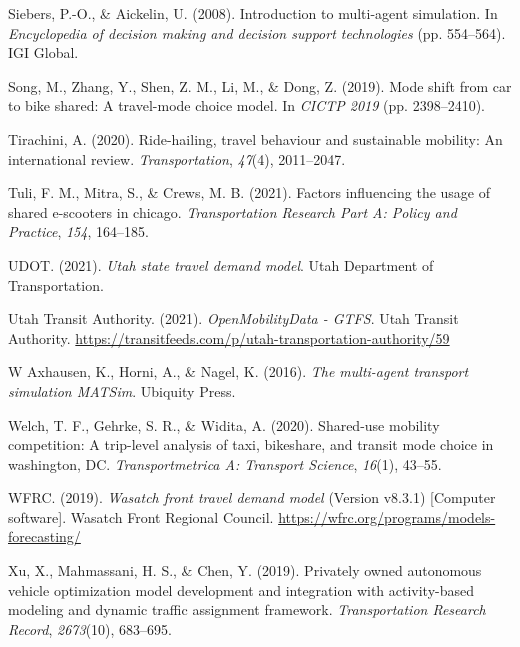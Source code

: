 \documentclass[fancy, masters]{byuthesis}
\newlength{\cslhangindent}
\newlength{\cslentryspacingunit} %
\newenvironment{CSLReferences}[2] %
 {%
  \setlength{\parindent}{0pt}
  \ifodd #1
  \let\oldpar\par
  \def\par{\hangindent=\cslhangindent\oldpar}
  \fi
  \setlength{\parskip}{#2\cslentryspacingunit}
 }%
 {}
\begin{document}
\begin{CSLReferences}{1}{0}
\leavevmode{}%
Siebers, P.-O., \& Aickelin, U. (2008). Introduction to multi-agent simulation. In \emph{Encyclopedia of decision making and decision support technologies} (pp. 554--564). IGI Global.

\leavevmode{}%
Song, M., Zhang, Y., Shen, Z. M., Li, M., \& Dong, Z. (2019). Mode shift from car to bike shared: A travel-mode choice model. In \emph{CICTP 2019} (pp. 2398--2410).

\leavevmode{}%
Tirachini, A. (2020). Ride-hailing, travel behaviour and sustainable mobility: An international review. \emph{Transportation}, \emph{47}(4), 2011--2047.

\leavevmode{}%
Tuli, F. M., Mitra, S., \& Crews, M. B. (2021). Factors influencing the usage of shared e-scooters in chicago. \emph{Transportation Research Part A: Policy and Practice}, \emph{154}, 164--185.

\leavevmode{}%
UDOT. (2021). \emph{Utah state travel demand model}. Utah Department of Transportation.

\leavevmode{}%
Utah Transit Authority. (2021). \emph{OpenMobilityData - GTFS}. Utah Transit Authority. \url{https://transitfeeds.com/p/utah-transportation-authority/59}

\leavevmode{}%
W Axhausen, K., Horni, A., \& Nagel, K. (2016). \emph{The multi-agent transport simulation MATSim}. Ubiquity Press.

\leavevmode{}%
Welch, T. F., Gehrke, S. R., \& Widita, A. (2020). Shared-use mobility competition: A trip-level analysis of taxi, bikeshare, and transit mode choice in washington, DC. \emph{Transportmetrica A: Transport Science}, \emph{16}(1), 43--55.

\leavevmode{}%
WFRC. (2019). \emph{Wasatch front travel demand model} (Version v8.3.1) {[}Computer software{]}. Wasatch Front Regional Council. \url{https://wfrc.org/programs/models-forecasting/}

\leavevmode{}%
Xu, X., Mahmassani, H. S., \& Chen, Y. (2019). Privately owned autonomous vehicle optimization model development and integration with activity-based modeling and dynamic traffic assignment framework. \emph{Transportation Research Record}, \emph{2673}(10), 683--695.


\end{CSLReferences}
\end{document}
